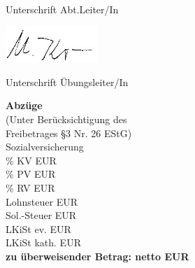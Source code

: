 \documentclass[a4paper,10pt,BCOR=0mm]{scrreprt}
\begin{document}
\begin{center}
\parbox{6cm}{
\vspace{9mm}
\begin{center}
Unterschrift Abt.Leiter/In
\end{center}
\vspace{9mm}
\includegraphics[width=3.5cm]{Tex-Vorlagen/Sign.jpg}
\begin{center}
Unterschrift Übungsleiter/In
\end{center}
}
\hfill
\parbox{0.45\textwidth }{
\begin{small}\textbf{Abzüge}\hfill \hspace*{2cm}\\
(Unter Berücksichtigung des\hfill \hspace*{2cm}\\
Freibetrages \S 3 Nr. 26 EStG)\hfill \hspace*{2cm}\\
\hspace*{2cm} Sozialversicherung \hfill \hspace*{2cm}\\
\hspace*{2cm} \% KV \hfill  EUR \hspace*{2cm} \\
\hspace*{2cm} \% PV \hfill  EUR \hspace*{2cm} \\
\hspace*{2cm} \% RV \hfill  EUR \hspace*{2cm} \\
Lohnsteuer  \hfill \hfill EUR \hspace*{2cm} \\
Sol.-Steuer  \hfill \hfill EUR \hspace*{2cm} \\
LKiSt ev. \hfill \hfill EUR \hspace*{2cm} \\
LKiSt kath. \hfill \hfill EUR \hspace*{2cm} \\
\hfill*\textbf{zu überweisender Betrag: netto EUR} \hspace*{2cm}\\
\end{small}}
\end{center}
\end{document}
